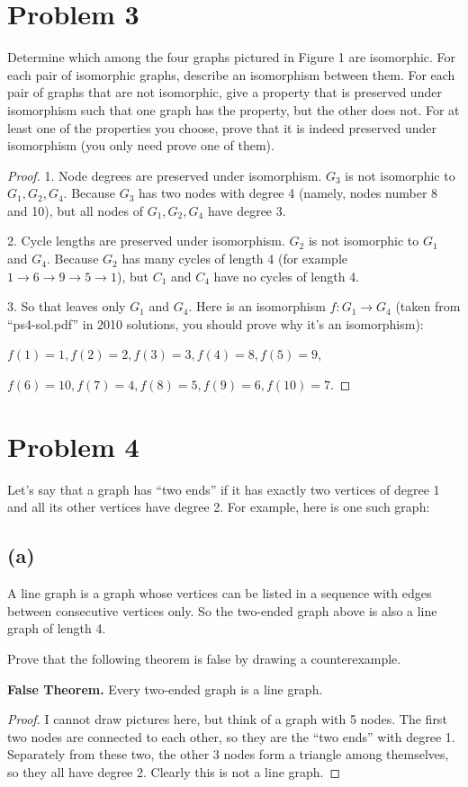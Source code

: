 \documentclass[14pt]{extarticle}
\begin{document}
\section{Problem 3}
Determine which among the four graphs pictured in Figure 1 are isomorphic. For each pair of isomorphic graphs, describe an isomorphism between them. For each pair of graphs that are not isomorphic, give a property that is preserved under isomorphism such that one graph has the property, but the other does not. For at least one of the properties you choose, prove that it is indeed preserved under isomorphism (you only need prove one of them).
\begin{proof}
1. Node degrees are preserved under isomorphism. $G_3$ is not isomorphic to $G_1, G_2, G_4$. Because $G_3$ has two nodes with degree 4 (namely, nodes number 8 and 10), but all nodes of $G_1, G_2, G_4$ have degree 3. 

2. Cycle lengths are preserved under isomorphism. $G_2$ is not isomorphic to $G_1$ and $G_4$. Because $G_2$ has many cycles of length 4 (for example $1 \rightarrow 6 \rightarrow 9 \rightarrow 5 \rightarrow 1$), but $C_1$ and $C_4$ have no cycles of length 4.

3. So that leaves only $G_1$ and $G_4$. Here is an isomorphism $f: G_1 \to G_4$ (taken from ``ps4-sol.pdf'' in 2010 solutions, you should prove why it's an isomorphism):

$f(1) = 1, f(2) = 2, f(3) = 3, f(4) = 8, f(5) = 9$,

$f(6) = 10, f(7) = 4, f(8) = 5, f(9) = 6, f(10) = 7$.
\end{proof}

\section{Problem 4}
Let’s say that a graph has “two ends” if it has exactly two vertices of degree 1 and all its other vertices have degree 2. For example, here is one such graph:

\subsection{(a)}
A line graph is a graph whose vertices can be listed in a sequence with edges between consecutive vertices only. So the two-ended graph above is also a line graph of length 4. 

Prove that the following theorem is false by drawing a counterexample.

{\bf False Theorem.} Every two-ended graph is a line graph.
\begin{proof}
I cannot draw pictures here, but think of a graph with 5 nodes. The first two nodes are connected to each other, so they are the ``two ends'' with degree 1. Separately from these two, the other 3 nodes form a triangle among themselves, so they all have degree 2. Clearly this is not a line graph.
\end{proof}
\end{document}

